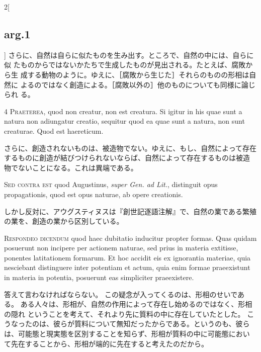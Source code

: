 \documentclass[paper=a4paper,fontsize=10pt,jafontsize=9pt,titlepage]{jlreq}
\begin{document}
\begin{paracol}{2}[\subsection{arg.1}]
さらに、自然は自らに似たものを生み出す。ところで、自然の中には、自らに似
たものからではないかたちで生成したものが見出される。たとえば、腐敗から生
成する動物のように。ゆえに、［腐敗から生じた］それらのものの形相は自然に
よるのではなく創造による。［腐敗以外の］他のものについても同様に論じられ
る。


{\scshape 4 Praeterea}, quod non creatur, non est
creatura. Si igitur in his quae sunt a natura non adiungatur creatio,
sequitur quod ea quae sunt a natura, non sunt creaturae. Quod est
haereticum.

\switchcolumn

さらに、創造されないものは、被造物でない。ゆえに、もし、自然によって存在
 するものに創造が結びつけられないならば、自然によって存在するものは被造
 物でないことになる。これは異端である。

\switchcolumn*[\subsection{s.c.}]

{\scshape Sed contra est} quod Augustinus, {\itshape super
Gen. ad Lit.}, distinguit opus propagationis, quod est opus naturae, ab
opere creationis.

\switchcolumn

しかし反対に、アウグスティヌスは『創世記逐語注解』で、自然の業である繁殖
 の業を、創造の業から区別している。


{\scshape Respondeo dicendum} quod haec dubitatio
inducitur propter formas. Quas quidam posuerunt non incipere per
actionem naturae, sed prius in materia extitisse, ponentes latitationem
formarum. Et hoc accidit eis ex ignorantia materiae, quia nesciebant
distinguere inter potentiam et actum, quia enim formae praeexistunt in
materia in potentia, posuerunt eas simpliciter praeexistere.

\switchcolumn

答えて言わなければならない。
この疑念が入ってくるのは、形相のせいである。
ある人々は、形相が、自然の作用によって存在し始めるのではなく、形相の隠れ
 ということを考えて、それより先に質料の中に存在していたとした。
こうなったのは、彼らが質料について無知だったからである。というのも、彼ら
 は、可能態と現実態を区別することを知らず、形相が質料の中に可能態におい
 て先在することから、形相が端的に先在すると考えたのだから。


\end{paracol}
\end{document}
